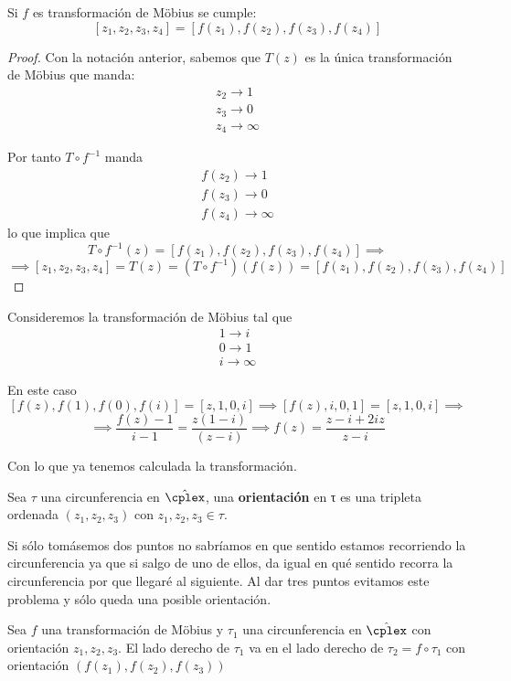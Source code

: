 \documentclass{apuntes}
\begin{document}
\begin{lemma}
Si $f$ es transformación de Möbius se cumple:
\[[z_1,z_2,z_3,z_4]=[f(z_1),f(z_2),f(z_3),f(z_4)]\]
\end{lemma}

\begin{proof}
Con la notación anterior, sabemos que $T(z)$ es la única transformación de Möbius que manda:
\begin{align*}
z_2 \to 1\\ z_3 \to 0 \\ z_4 \to \infty
\end{align*}

Por tanto $T\circ f^{-1}$ manda
\begin{align*}
f(z_2) \to 1\\ f(z_3) \to 0 \\ f(z_4) \to \infty
\end{align*}
lo que implica que
\[T\circ f^{-1}(z)=[f(z_1),f(z_2),f(z_3),f(z_4)] \implies \]
\[\implies [z_1,z_2,z_3,z_4] = T(z)=(T \circ f^{-1})(f(z))=[f(z_1),f(z_2),f(z_3),f(z_4)]\]
\end{proof}

\begin{example}
Consideremos la transformación de Möbius tal que
\begin{align*}
1 \to i\\ 0 \to 1 \\ i \to \infty
\end{align*}

En este caso
\[[f(z),f(1),f(0),f(i)]=[z,1,0,i]\implies [f(z),i,0,1]=[z,1,0,i]\implies \]
\[\implies \frac{f(z)-1}{i-1} = \frac{z(1-i)}{(z-i)} \implies f(z)=\frac{z-i+2iz}{z-i}\]

Con lo que ya tenemos calculada la transformación.
\end{example}

\begin{defn}[Orientación]
Sea $τ$ una circunferencia en $\hat{\cplex}$, una \textbf{orientación} en τ es una tripleta ordenada $(z_1,z_2,z_3)$ con $z_1,z_2,z_3 \in τ$.

\obs Si sólo tomásemos dos puntos no sabríamos en que sentido estamos recorriendo la circunferencia ya que si salgo de uno de ellos, da igual en qué sentido recorra la circunferencia por que llegaré al siguiente. Al dar tres puntos evitamos este problema y sólo queda una posible orientación.
\end{defn}

\begin{prop}
Sea $f$ una transformación de Möbius y $τ_1$ una circunferencia en $\hat{\cplex}$ con orientación $z_1,z_2,z_3$. El lado derecho de $τ_1$ va en el lado derecho de $τ_2=f \circ τ_1$ con orientación $(f(z_1),f(z_2),f(z_3))$
\end{prop}
\end{document}
